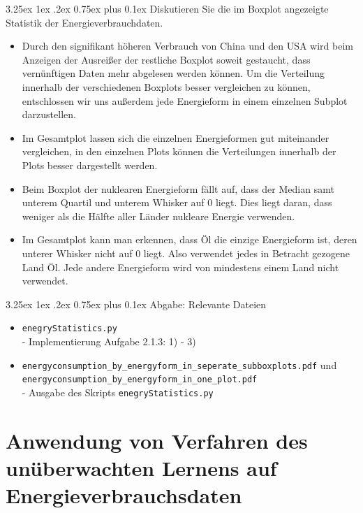 \documentclass[12pt,a4paper]{scrartcl}
\makeatletter
\renewcommand\subparagraph{\@startsection{subparagraph}{5}{\parindent}%
    {3.25ex \@plus1ex \@minus .2ex}%
    {0.75ex plus 0.1ex}%
    {\normalfont\normalsize\bfseries}}
\makeatother
\begin{document}
\subparagraph{Diskutieren Sie die im Boxplot angezeigte Statistik der Energieverbrauchdaten.}
\begin{itemize}
\item Durch den signifikant h\"oheren Verbrauch von China und den USA wird beim Anzeigen der Ausrei\ss er der restliche Boxplot soweit gestaucht, dass vern\"unftigen Daten mehr abgelesen werden k\"onnen. 
Um die Verteilung innerhalb der verschiedenen Boxplots besser vergleichen zu k\"onnen, entschlossen wir uns au\ss erdem jede Energieform in einem einzelnen Subplot darzustellen. 
\item Im Gesamtplot lassen sich die einzelnen Energieformen gut miteinander vergleichen, in den einzelnen Plots k\"onnen die Verteilungen innerhalb der Plots besser dargestellt werden.  
\item Beim Boxplot der nuklearen Energieform f\"allt auf, dass der Median samt unterem Quartil und unterem Whisker auf 0 liegt. Dies liegt daran, dass weniger als die H\"alfte aller L\"ander nukleare Energie verwenden. 
\item Im Gesamtplot kann man erkennen, dass \"Ol die einzige Energieform ist, deren unterer Whisker nicht auf 0 liegt. Also verwendet jedes in Betracht gezogene Land \"Ol. Jede andere Energieform wird von mindestens einem Land nicht verwendet. 
\end{itemize}

\subparagraph{Abgabe: Relevante Dateien}
\begin{itemize}
\item \lstinline{enegryStatistics.py} \\- Implementierung Aufgabe 2.1.3: 1) - 3)
\item \lstinline{energyconsumption_by_energyform_in_seperate_subboxplots.pdf} und \\ \lstinline{energyconsumption_by_energyform_in_one_plot.pdf} \\- Ausgabe des Skripts \lstinline{enegryStatistics.py}
\end{itemize}


\section*{Anwendung von Verfahren des un\"uberwachten Lernens auf Energieverbrauchsdaten}
\end{document}
